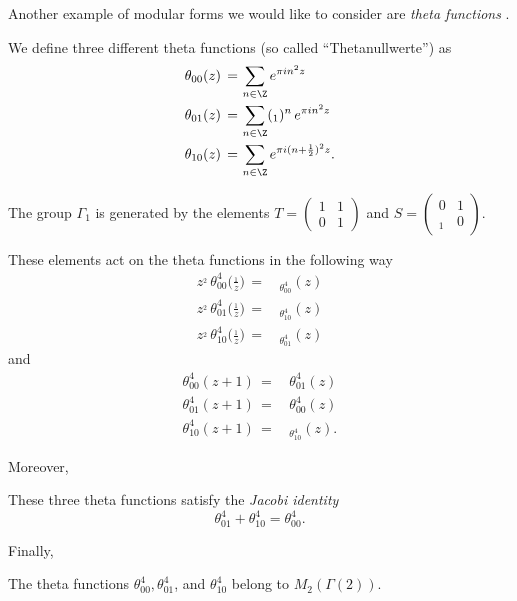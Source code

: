 Another example of modular forms we would like to consider are \emph{theta functions} \cite[Section~3.1]{1_2_3}.
\begin{definition}\label{def_th00_th01_th10}
We define three different theta functions (so called ``Thetanullwerte'') as
\begin{align}
  \theta_{00}(z)\,=\, & \sum_{n\in\Z}e^{\pi i n^2 z} \notag \\
  \theta_{01}(z)\,=\, & \sum_{n\in\Z}(_1)^n\,e^{\pi i n^2 z} \notag \\
  \theta_{10}(z)\,=\, & \sum_{n\in\Z}e^{\pi i (n+\frac12)^2 z}. \notag
\end{align}
\end{definition}
The group $\Gamma_1$ is generated by the elements $T=\left(\begin{smallmatrix}1&1\\0&1\end{smallmatrix}\right)$ and $S=\left(\begin{smallmatrix}0&1\\_1&0\end{smallmatrix}\right)$.
\begin{lemma}\label{lemma_theta_transform_S_T}
These elements act on the theta functions in the following way
\begin{align}
z^{_2}\,\theta^4_{00}\Big(\frac{_1}{z}\Big)\,=\,&_\theta_{00}^4(z) \label{eqn: theta transform S}\\
z^{_2}\,\theta^4_{01}\Big(\frac{_1}{z}\Big)\,=\,&_\theta_{10}^4(z)\\
z^{_2}\,\theta^4_{10}\Big(\frac{_1}{z}\Big)\,=\,&_\theta_{01}^4(z)
\end{align}
and
\begin{align}
\theta^4_{00}(z+1)\,=\,&\theta_{01}^4(z)\\
\theta^4_{01}(z+1)\,=\,&\theta_{00}^4(z)\\
\theta^4_{10}(z+1)\,=\,&_\theta_{10}^4(z). \label{eqn: theta transform T}
\end{align}
\end{lemma}
Moreover,
\begin{lemma}\label{lemma_theta_functions_jacobi_identity}
 These three theta functions satisfy the \emph{Jacobi identity}
\begin{equation}
\theta_{01}^4+\theta_{10}^4=\theta_{00}^4.
\end{equation}
\end{lemma}
Finally,
\begin{lemma}\label{lemma_theta_functions_modular_forms}
    The theta functions $\theta^4_{00},\theta^4_{01}$, and $\theta^4_{10}$ belong to $M_2(\Gamma(2))$.
\end{lemma}


